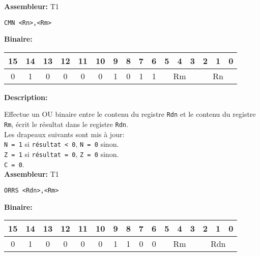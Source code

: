 \documentclass{article}
\begin{document}
    \textbf{Assembleur:} T1

    \begin{lstlisting}
CMN <Rn>,<Rm>
    \end{lstlisting}

    \textbf{Binaire:}

    \begin{tabular}{| c c c c c c c c c c c c c c c c |}
        \hline
        15 & 14 & 13 & 12 & 11 & 10 & \multicolumn{1}{|c}{9} & 8 & 7 & 6 & \multicolumn{1}{|c}{5} & 4 & 3 & \multicolumn{1}{|c}{2} & 1 & 0 \\
        \hline
        0 & 1 & 0 & 0 & 0 & 0 & \multicolumn{1}{|c}{1} & 0 & 1 & 1 & \multicolumn{3}{|c}{Rm} & \multicolumn{3}{|c|}{Rn} \\
        \hline
    \end{tabular}



    \textbf{Description: }

    Effectue un OU binaire entre le contenu du registre \texttt{Rdn} et le contenu du registre \texttt{Rm}, écrit le résultat dans le registre \texttt{Rdn}.\\
    Les drapeaux suivants sont mis à jour:\\
    \texttt{N = 1} si \texttt{résultat < 0}, \texttt{N = 0} sinon.\\
    \texttt{Z = 1} si \texttt{résultat = 0}, \texttt{Z = 0} sinon.\\
    \texttt{C = 0}.\\

    \textbf{Assembleur:} T1

    \begin{lstlisting}
ORRS <Rdn>,<Rm>
    \end{lstlisting}

    \textbf{Binaire:}

    \begin{tabular}{| c c c c c c c c c c c c c c c c |}
        \hline
        15 & 14 & 13 & 12 & 11 & 10 & \multicolumn{1}{|c}{9} & 8 & 7 & 6 & \multicolumn{1}{|c}{5} & 4 & 3 & \multicolumn{1}{|c}{2} & 1 & 0 \\
        \hline
        0 & 1 & 0 & 0 & 0 & 0 & \multicolumn{1}{|c}{1} & 1 & 0 & 0 & \multicolumn{3}{|c}{Rm} & \multicolumn{3}{|c|}{Rdn} \\
        \hline
    \end{tabular}


\end{document}
